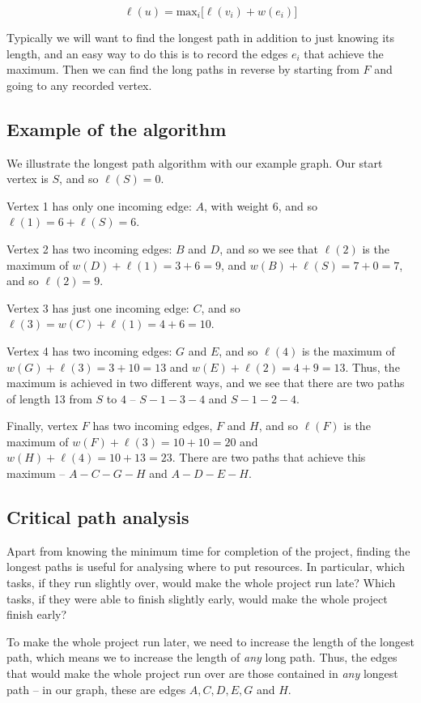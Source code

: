 \documentclass[]{article}
\begin{document}
\[\ell(u)=\text{max}_i \big[\ell(v_i)+w(e_i)\big]\]

Typically we will want to find the longest path in addition to just
knowing its length, and an easy way to do this is to record the edges
\(e_i\) that achieve the maximum. Then we can find the long paths in
reverse by starting from \(F\) and going to any recorded vertex.

\subsection{Example of the algorithm}\label{example-of-the-algorithm}

We illustrate the longest path algorithm with our example graph. Our
start vertex is \(S\), and so \(\ell(S)=0\).

Vertex 1 has only one incoming edge: \(A\), with weight 6, and so
\(\ell(1)=6+\ell(S)=6\).

Vertex 2 has two incoming edges: \(B\) and \(D\), and so we see that
\(\ell(2)\) is the maximum of \(w(D)+\ell(1)=3+6=9\), and
\(w(B)+\ell(S)=7+0=7\), and so \(\ell(2)=9\).

Vertex 3 has just one incoming edge: \(C\), and so
\(\ell(3)=w(C)+\ell(1)=4+6=10\).

Vertex 4 has two incoming edges: \(G\) and \(E\), and so \(\ell(4)\) is
the maximum of \(w(G)+\ell(3)=3+10=13\) and \(w(E)+\ell(2)=4+9=13\).
Thus, the maximum is achieved in two different ways, and we see that
there are two paths of length 13 from \(S\) to \(4\) -- \(S-1-3-4\) and
\(S-1-2-4\).

Finally, vertex \(F\) has two incoming edges, \(F\) and \(H\), and so
\(\ell(F)\) is the maximum of \(w(F)+\ell(3)=10+10=20\) and
\(w(H)+\ell(4)=10+13=23\). There are two paths that achieve this maximum
-- \(A-C-G-H\) and \(A-D-E-H\).

\subsection{Critical path analysis}\label{critical-path-analysis}

Apart from knowing the minimum time for completion of the project,
finding the longest paths is useful for analysing where to put
resources. In particular, which tasks, if they run slightly over, would
make the whole project run late? Which tasks, if they were able to
finish slightly early, would make the whole project finish early?

To make the whole project run later, we need to increase the length of
the longest path, which means we to increase the length of \emph{any}
long path. Thus, the edges that would make the whole project run over
are those contained in \emph{any} longest path -- in our graph, these
are edges \(A,C,D,E, G\) and \(H\).
\end{document}
